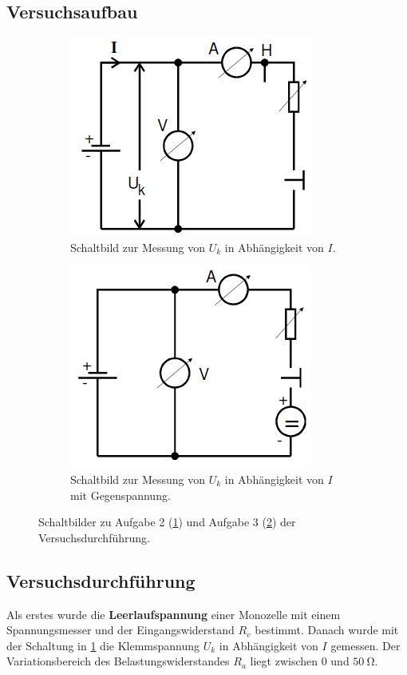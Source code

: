 \subsection{Versuchsaufbau}
\begin{figure}
  \centering
  \begin{subfigure}{0.45\textwidth}
    \centering
    \includegraphics[scale=0.6]{durch.png}
    \caption{Schaltbild zur Messung von $U_k$ in Abhängigkeit von $I$.}
    \label{sub:1}
    \qquad
  \end{subfigure}
  \begin{subfigure}{0.45\textwidth}
    \centering
    \includegraphics[scale=0.6]{durch2.png}
    \caption{Schaltbild zur Messung von $U_k$ in Abhängigkeit von $I$ mit Gegenspannung.}
    \label{sub:2}
    \qquad
  \end{subfigure}
  \caption{Schaltbilder zu Aufgabe 2 (\ref{sub:1}) und Aufgabe 3 (\ref{sub:2})
  der Versuchsdurchführung.}
  \label{fig:2}
\end{figure}
\subsection{Versuchsdurchführung}
\label{sec:3.2}
Als erstes wurde die \textbf{Leerlaufspannung} einer Monozelle mit einem Spannungsmesser
und der Eingangswiderstand $R_v$ bestimmt. Danach wurde mit der Schaltung in \ref{sub:1}
die Klemmspannung $U_k$ in Abhängigkeit von $I$ gemessen. Der Variationsbereich des
Belastungswiderstandes $R_a$ liegt zwischen 0 und $\SI{50}{\ohm}$. %

